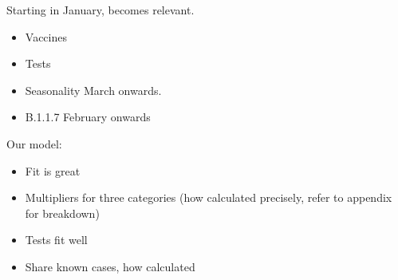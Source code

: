 Starting in January,  becomes relevant.
\begin{itemize}
    \item Vaccines
    \item Tests
    \item Seasonality March onwards.
    \item B.1.1.7 February onwards
\end{itemize}

Our model:
\begin{itemize}
    \item Fit is great
    \item Multipliers for three categories (how calculated precisely, refer to appendix for breakdown)
    \item Tests fit well
    \item Share known cases, how calculated
\end{itemize}

